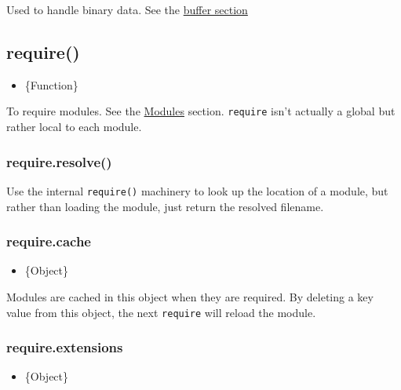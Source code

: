 Used to handle binary data. See the \href{buffer.html}{buffer section}

\subsection{require()}

\begin{itemize}
\item
  \{Function\}
\end{itemize}

To require modules. See the
\href{modules.html\#modules\_modules}{Modules} section. \texttt{require}
isn't actually a global but rather local to each module.

\subsubsection{require.resolve()}

Use the internal \texttt{require()} machinery to look up the location of
a module, but rather than loading the module, just return the resolved
filename.

\subsubsection{require.cache}

\begin{itemize}
\item
  \{Object\}
\end{itemize}

Modules are cached in this object when they are required. By deleting a
key value from this object, the next \texttt{require} will reload the
module.

\subsubsection{require.extensions}

\begin{Shaded}
\begin{Highlighting}[]
\NormalTok{: } 
\end{Highlighting}
\end{Shaded}

\begin{itemize}
\item
  \{Object\}
\end{itemize}

